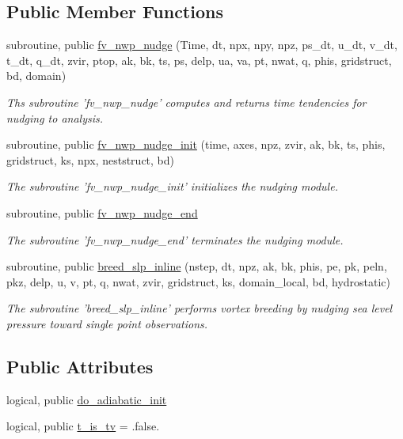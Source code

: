 \subsection*{Public Member Functions}
\begin{DoxyCompactItemize}
\item 
subroutine, public \hyperlink{classfv__nwp__nudge__mod_a4dfc72f39d2590d5b021acee04c23a2c}{fv\-\_\-nwp\-\_\-nudge} (Time, dt, npx, npy, npz, ps\-\_\-dt, u\-\_\-dt, v\-\_\-dt, t\-\_\-dt, q\-\_\-dt, zvir, ptop, ak, bk, ts, ps, delp, ua, va, pt, nwat, q, phis, gridstruct, bd, domain)
\begin{DoxyCompactList}\small\item\em Ths subroutine 'fv\-\_\-nwp\-\_\-nudge' computes and returns time tendencies for nudging to analysis. \end{DoxyCompactList}\item 
subroutine, public \hyperlink{classfv__nwp__nudge__mod_ac6397ea7496a338d4a086a95bb58fa38}{fv\-\_\-nwp\-\_\-nudge\-\_\-init} (time, axes, npz, zvir, ak, bk, ts, phis, gridstruct, ks, npx, neststruct, bd)
\begin{DoxyCompactList}\small\item\em The subroutine 'fv\-\_\-nwp\-\_\-nudge\-\_\-init' initializes the nudging module. \end{DoxyCompactList}\item 
subroutine, public \hyperlink{classfv__nwp__nudge__mod_a824609f6aaef3ce3b013048f4402ecb6}{fv\-\_\-nwp\-\_\-nudge\-\_\-end}
\begin{DoxyCompactList}\small\item\em The subroutine 'fv\-\_\-nwp\-\_\-nudge\-\_\-end' terminates the nudging module. \end{DoxyCompactList}\item 
subroutine, public \hyperlink{classfv__nwp__nudge__mod_af4d9fdbd6e2f0f78ded73848bd81ee15}{breed\-\_\-slp\-\_\-inline} (nstep, dt, npz, ak, bk, phis, pe, pk, peln, pkz, delp, u, v, pt, q, nwat, zvir, gridstruct, ks, domain\-\_\-local, bd, hydrostatic)
\begin{DoxyCompactList}\small\item\em The subroutine 'breed\-\_\-slp\-\_\-inline' performs vortex breeding by nudging sea level pressure toward single point observations. \end{DoxyCompactList}\end{DoxyCompactItemize}
\subsection*{Public Attributes}
\begin{DoxyCompactItemize}
\item 
logical, public \hyperlink{classfv__nwp__nudge__mod_a1be70541c37811b39b54dcf8d977feac}{do\-\_\-adiabatic\-\_\-init}
\item 
logical, public \hyperlink{classfv__nwp__nudge__mod_a85c0708a93d6f338cfa8408215a55c3b}{t\-\_\-is\-\_\-tv} = .false.
\end{DoxyCompactItemize}
